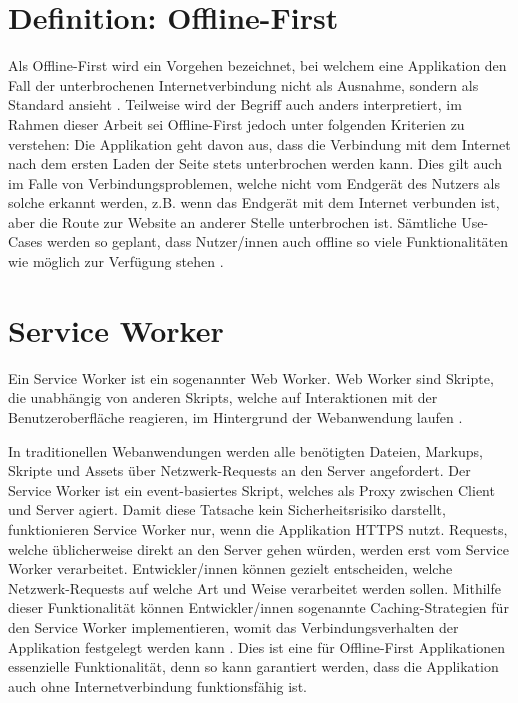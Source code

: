\documentclass[a4paper, 12pt]{scrreprt}
\begin{document}
\section{Definition: Offline-First}\label{sec:DefinitionOfflineFirst}
Als Offline-First wird ein Vorgehen bezeichnet, bei welchem eine Applikation den Fall der unterbrochenen Internetverbindung nicht als Ausnahme, sondern als Standard ansieht \autocite{OnlineGoogleProgressiveWebApps}. Teilweise wird der Begriff auch anders interpretiert, im Rahmen dieser Arbeit sei Offline-First jedoch unter folgenden Kriterien zu verstehen: Die Applikation geht davon aus, dass die Verbindung mit dem Internet nach dem ersten Laden der Seite stets unterbrochen werden kann. Dies gilt auch im Falle von Verbindungsproblemen, welche nicht vom Endgerät des Nutzers als solche erkannt werden, z.B. wenn das Endgerät mit dem Internet verbunden ist, aber die Route zur Website an anderer Stelle unterbrochen ist. Sämtliche Use-Cases werden so geplant, dass Nutzer/innen auch offline so viele Funktionalitäten wie möglich zur Verfügung stehen \autocite{ArticleDesigningOfflineFirst}. 



\section{Service Worker}
\label{sec:serviceworker}

Ein Service Worker ist ein sogenannter Web Worker. Web Worker sind Skripte, die unabhängig von anderen Skripts, welche auf Interaktionen mit der Benutzeroberfläche reagieren, im Hintergrund der Webanwendung laufen \autocite{OnlineHTTPWorker}.

In traditionellen Webanwendungen werden alle benötigten Dateien, Markups, Skripte und Assets über Netzwerk-Requests an den Server angefordert. Der Service Worker ist ein event-basiertes Skript, welches als Proxy zwischen Client und Server agiert. Damit diese Tatsache kein Sicherheitsrisiko darstellt, funktionieren Service Worker nur, wenn die Applikation \ac{HTTPS} nutzt. Requests, welche üblicherweise direkt an den Server gehen würden, werden erst vom Service Worker verarbeitet. Entwickler/innen können gezielt entscheiden, welche Netzwerk-Requests auf welche Art und Weise verarbeitet werden sollen. Mithilfe dieser Funktionalität können Entwickler/innen sogenannte Caching-Strategien für den Service Worker implementieren, womit das Verbindungsverhalten der Applikation festgelegt werden kann \autocite{OnlineServiceWorkersAnIntroduction}. Dies ist eine für Offline-First Applikationen essenzielle Funktionalität, denn so kann garantiert werden, dass die Applikation auch ohne Internetverbindung funktionsfähig ist. 
\end{document}
